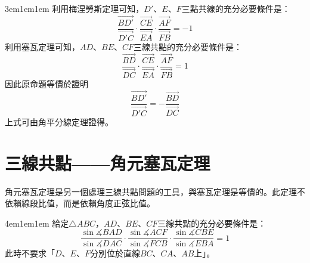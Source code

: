 \documentclass[12pt]{article}
\begin{document}
\begin{mybox}[解]{3em}{1em}{1em}
    利用梅涅勞斯定理可知，$D'$、$E$、$F$三點共線的充分必要條件是：
    $$
        \frac{\overrightarrow{BD'}}{\overrightarrow{D'C}}
        \cdot\frac{\overrightarrow{CE}}{\overrightarrow{EA}}
        \cdot\frac{\overrightarrow{AF}}{\overrightarrow{FB}} = -1
    $$
    利用塞瓦定理可知，$AD$、$BE$、$CF$三線共點的充分必要條件是：
    $$
        \frac{\overrightarrow{BD}}{\overrightarrow{DC}}
        \cdot\frac{\overrightarrow{CE}}{\overrightarrow{EA}}
        \cdot\frac{\overrightarrow{AF}}{\overrightarrow{FB}} = 1\label{eq:ceva_example2-2}
    $$
    因此原命題等價於證明
    $$
        \frac{\overrightarrow{BD'}}{\overrightarrow{D'C}}=-\frac{\overrightarrow{BD}}{\overrightarrow{DC}}
    $$
    上式可由角平分線定理證得。
\end{mybox}
\newpage
\section{三線共點——角元塞瓦定理}
角元塞瓦定理是另一個處理三線共點問題的工具，與塞瓦定理是等價的。此定理不依賴線段比值，而是依賴角度正弦比值。
\begin{mybox}[定理]{4em}{1em}{1em}
    給定$\triangle{ABC}$，$AD$、$BE$、$CF$三線共點的充分必要條件是：
    $$
        \frac{\sin{\measuredangle{BAD}}}{\sin{\measuredangle{DAC}}}
        \cdot\frac{\sin{\measuredangle{ACF}}}{\sin{\measuredangle{FCB}}}
        \cdot\frac{\sin{\measuredangle{CBE}}}{\sin{\measuredangle{EBA}}} = 1
    $$
    此時不要求「$D$、$E$、$F$分別位於直線$BC$、$CA$、$AB$上」。
\end{mybox}
\end{document}
